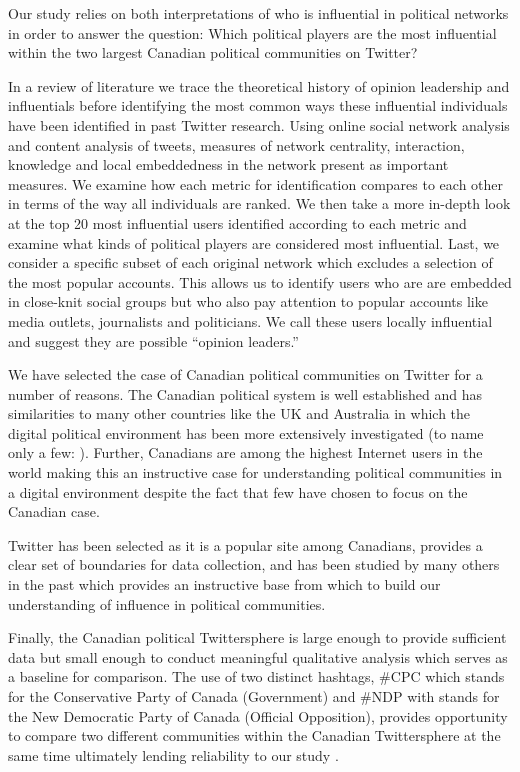 \documentclass[a4paper,12pt]{article}
\begin{document}
Our study relies on both interpretations of who is influential in political networks in order to answer the question: Which political players are the most influential within the two largest Canadian political communities on Twitter?

In a review of literature we trace the theoretical history of opinion leadership and influentials before identifying the most common ways these influential individuals have been identified in past Twitter research. Using online social network analysis and content analysis of tweets, measures of network centrality, interaction, knowledge and local embeddedness in the network present as important measures.  We examine how each metric for identification compares to each other in terms of the way all individuals are ranked. We then take a more in-depth look at the top 20 most influential users identified according to each metric and examine what kinds of political players are considered most influential. Last, we consider a specific subset of each original network which excludes a selection of the most popular accounts. This allows us to identify users who are are embedded in close-knit social groups but who also pay attention to popular accounts like media outlets, journalists and politicians. We call these users locally influential and suggest they are possible ``opinion leaders.'' 

We have selected the case of Canadian political communities on Twitter for a number of reasons. The Canadian political system is well established and has similarities to many other countries like the UK and Australia in which the digital political environment has been more extensively investigated (to name only a few: \cite{GibsonLusoliWard2005, Coleman2004, GibsonWard2002}). Further, Canadians are among the highest Internet users in the world \cite{comscore} making this an instructive case for understanding political communities in a digital environment despite the fact that few have chosen to focus on the Canadian case.

Twitter has been selected as it is a popular site among Canadians, provides a clear set of boundaries for data collection, and has been studied by many others in the past which provides an instructive base from which to build our understanding of influence in political communities.

Finally, the Canadian political Twittersphere is large enough to provide sufficient data but small enough to conduct meaningful qualitative analysis which serves as a baseline for comparison. The use of two distinct hashtags, \#CPC which stands for the Conservative Party of Canada (Government) and \#NDP with stands for the New Democratic Party of Canada (Official Opposition), provides opportunity to compare two different communities within the Canadian Twittersphere at the same time ultimately lending reliability to our study \cite{Yin2009}. 
\end{document}
